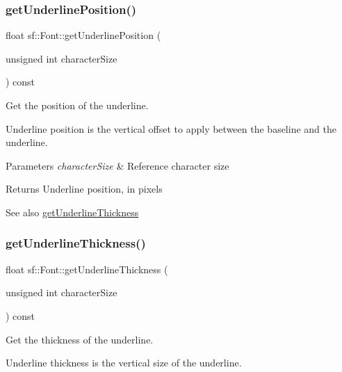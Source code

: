 \subsubsection{\texorpdfstring{get\+Underline\+Position()}{getUnderlinePosition()}}
{\footnotesize\ttfamily float sf\+::\+Font\+::get\+Underline\+Position (\begin{DoxyParamCaption}\item[{unsigned int}]{character\+Size }\end{DoxyParamCaption}) const}



Get the position of the underline. 

Underline position is the vertical offset to apply between the baseline and the underline.


\begin{DoxyParams}{Parameters}
{\em character\+Size} & Reference character size\\
\hline
\end{DoxyParams}
\begin{DoxyReturn}{Returns}
Underline position, in pixels
\end{DoxyReturn}
\begin{DoxySeeAlso}{See also}
\hyperlink{classsf_1_1_font_ad6d0a5bc6c026fe85c239f1f822b54e6}{get\+Underline\+Thickness} 
\end{DoxySeeAlso}
\mbox{\label{classsf_1_1_font_ad6d0a5bc6c026fe85c239f1f822b54e6}} 
\subsubsection{\texorpdfstring{get\+Underline\+Thickness()}{getUnderlineThickness()}}
{\footnotesize\ttfamily float sf\+::\+Font\+::get\+Underline\+Thickness (\begin{DoxyParamCaption}\item[{unsigned int}]{character\+Size }\end{DoxyParamCaption}) const}



Get the thickness of the underline. 

Underline thickness is the vertical size of the underline.


